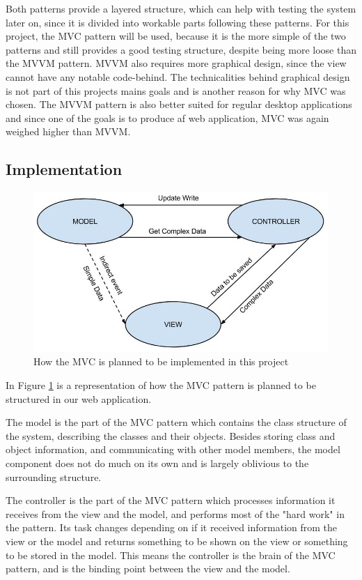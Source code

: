 Both patterns provide a layered structure, which can help with testing the system later on, since it is divided into workable parts following these patterns. For this project, the MVC pattern will be used, because it is the more simple of the two patterns and still provides a good testing structure, despite being more loose than the MVVM pattern. MVVM also requires more graphical design, since the view cannot have any notable code-behind. The technicalities behind graphical design is not part of this projects mains goals and is another reason for why MVC was chosen. The MVVM pattern is also better suited for regular desktop applications and since one of the goals is to produce af web application, MVC was again weighed higher than MVVM.

\subsection{Implementation}

\begin{figure}[htb]
\centering
\includegraphics[width=1\textwidth]{Images/MVC.jpg}
\caption{How the MVC is planned to be implemented in this project}
\label{MVC}
\end{figure}

In Figure \ref{MVC} is a representation of how the MVC pattern is planned to be structured in our web application.

The model is the part of the MVC pattern which contains the class structure of the system, describing the classes and their objects. Besides storing class and object information, and communicating with other model members, the model component does not do much on its own and is largely oblivious to the surrounding structure.

The controller is the part of the MVC pattern which processes information it receives from the view and the model, and performs most of the "hard work" in the pattern. Its task changes depending on if it received information from the view or the model and returns something to be shown on the view or something to be stored in the model. This means the controller is the brain of the MVC pattern, and is the binding point between the view and the model.

